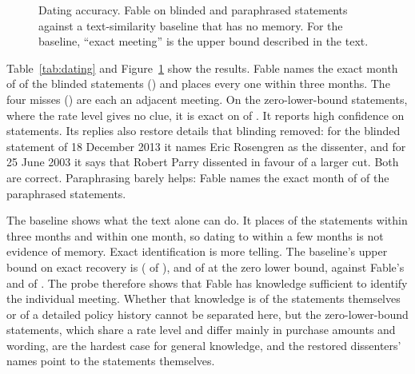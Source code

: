 \begin{table}[t]
\centering
\caption{Dating blinded and paraphrased statements}\label{tab:dating}
\footnotesize
\setlength{\tabcolsep}{4pt}

\end{table}

\begin{figure}[t]
\centering

\caption{Dating accuracy. Fable on blinded and paraphrased statements against a text-similarity baseline
that has no memory. For the baseline, ``exact meeting'' is the upper bound described in the text.}\label{fig:dating}
\end{figure}

Table~\ref{tab:dating} and Figure~\ref{fig:dating} show the results. Fable names the exact month of
 of the  blinded statements () and places
every one within three months. The four misses () are each an adjacent meeting. On
the zero-lower-bound statements, where the rate level gives no clue, it is exact on  of
. It reports high confidence on  statements. Its replies also
restore details that blinding removed: for the blinded statement of 18 December 2013 it names Eric
Rosengren as the dissenter, and for 25 June 2003 it says that Robert Parry dissented in favour of a larger
cut. Both are correct. Paraphrasing barely helps: Fable names the exact month of  of
the  paraphrased statements.

The baseline shows what the text alone can do. It places  of the statements within three
months and  within one month, so dating to within a few months is not evidence of memory.
Exact identification is more telling. The baseline's upper bound on exact recovery is 
( of ), and  of  at the zero lower bound, against
Fable's  and  of . The probe therefore shows
that Fable has knowledge sufficient to identify the individual meeting. Whether that knowledge is of the
statements themselves or of a detailed policy history cannot be separated here, but the
zero-lower-bound statements, which share a rate level and differ mainly in purchase amounts and wording,
are the hardest case for general knowledge, and the restored dissenters' names point to the statements
themselves.


